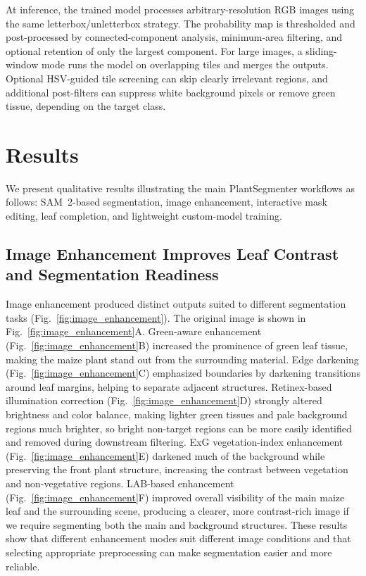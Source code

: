 \documentclass[12pt, a4paper]{article}
\begin{document}
At inference, the trained model processes arbitrary-resolution RGB images using the same letterbox/unletterbox strategy. The probability map is thresholded and post-processed by connected-component analysis, minimum-area filtering, and optional retention of only the largest component. For large images, a sliding-window mode runs the model on overlapping tiles and merges the outputs. Optional HSV-guided tile screening can skip clearly irrelevant regions, and additional post-filters can suppress white background pixels or remove green tissue, depending on the target class.


\section{Results}
\label{sec:results}

We present qualitative results illustrating the main PlantSegmenter workflows as follows: SAM~2-based segmentation, image enhancement, interactive mask editing, leaf completion, and lightweight custom-model training.


\subsection{Image Enhancement Improves Leaf Contrast and Segmentation Readiness}

Image enhancement produced distinct outputs suited to different segmentation tasks (Fig.~\ref{fig:image_enhancement}). The original image is shown in Fig.~\ref{fig:image_enhancement}A. Green-aware enhancement (Fig.~\ref{fig:image_enhancement}B) increased the prominence of green leaf tissue, making the maize plant stand out from the surrounding material. Edge darkening (Fig.~\ref{fig:image_enhancement}C) emphasized boundaries by darkening transitions around leaf margins, helping to separate adjacent structures. Retinex-based illumination correction (Fig.~\ref{fig:image_enhancement}D) strongly altered brightness and color balance, making lighter green tissues and pale background regions much brighter, so bright non-target regions can be more easily identified and removed during downstream filtering. ExG vegetation-index enhancement (Fig.~\ref{fig:image_enhancement}E) darkened much of the background while preserving the front plant structure, increasing the contrast between vegetation and non-vegetative regions. LAB-based enhancement (Fig.~\ref{fig:image_enhancement}F) improved overall visibility of the main maize leaf and the surrounding scene, producing a clearer, more contrast-rich image if we require segmenting both the main and background structures. These results show that different enhancement modes suit different image conditions and that selecting appropriate preprocessing can make segmentation easier and more reliable.
\end{document}
